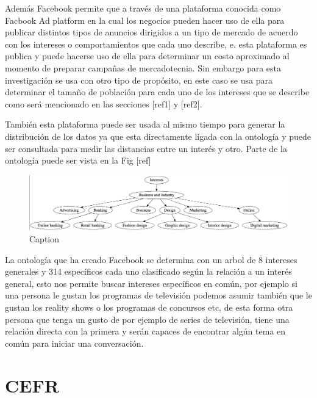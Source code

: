Además Facebook permite que a través de una plataforma conocida como Facbook Ad platform en la cual los negocios pueden hacer uso de ella para publicar distintos tipos de anuncios dirigidos a un tipo de mercado de acuerdo con los intereses o comportamientos que cada uno describe, e. esta plataforma es publica y puede hacerse uso de ella para determinar un costo aproximado al momento de preparar campañas de mercadotecnia. Sin embargo para esta investigación se usa con otro tipo de propósito, en este caso se usa para determinar el tamaño de población para cada uno de los intereses que se describe como será mencionado en las secciones [ref1] y [ref2]. 

También esta plataforma puede ser usada al mismo tiempo para generar la distribución de los datos ya que esta directamente ligada con la ontología y puede ser consultada para medir las distancias entre un interés y otro. Parte de la ontología puede ser vista en la Fig [ref]


\begin{figure}
    \centering
    \includegraphics[width=150mm]{ontology.png}
    \caption{Caption}
    \label{fig:my_label}
\end{figure}

La ontología que ha creado Facebook se determina con un arbol de 8 intereses generales y 314 específicos cada uno clasificado según la relación a un interés general, esto nos permite buscar intereses específicos en común, por ejemplo si una persona le gustan los programas de televisión podemos asumir también que le gustan los reality shows o los programas de concursos etc, de esta forma otra persona que tenga un gusto de por ejemplo de series de televisión, tiene una relación directa con la primera y serán capaces de encontrar algún tema en común para iniciar una conversación.


\section{CEFR}

